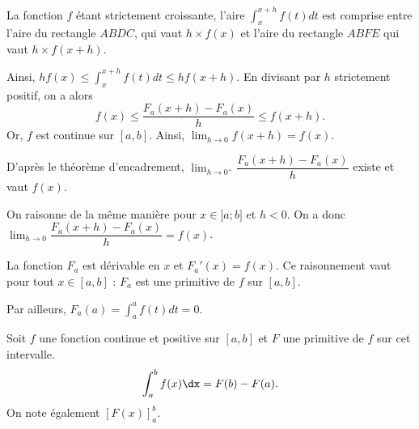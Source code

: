 \documentclass[11pt,fleqn, openany]{book} %
\begin{document}
\begin{demonstration}
\begin{center}
\end{center}

La fonction $f$ étant strictement croissante, l'aire $\displaystyle\int_{x}^{x+h} f(t)dt$ est comprise entre l'aire du rectangle $ABDC$, qui vaut $h \times f(x)$ et l'aire du rectangle $ABFE$ qui vaut $h \times f(x+h)$.

Ainsi, $hf(x)\leqslant \displaystyle\int_{x}^{x+h} f(t)dt \leqslant hf(x+h)$. En divisant par $h$ strictement positif, on a alors
\[ f(x) \leqslant \dfrac{F_a(x+h)-F_a(x)}{h} \leqslant f(x+h).\]
Or, $f$ est continue sur $[a,b]$. Ainsi, $\displaystyle \lim_{h \to 0} f(x+h)=f(x)$. 

D'après le théorème d'encadrement, $\displaystyle \lim_{h \to 0^+}\dfrac{F_a(x+h)-F_a(x)}{h}$ existe et vaut $f(x)$.

On raisonne de la même manière pour $x\in]a;b]$ et $h<0$. On a donc $\displaystyle \lim_{h \to 0}\dfrac{F_a(x+h)-F_a(x)}{h}=f(x)$. 

La fonction $F_a$ est dérivable en $x$ et $F_a'(x)=f(x)$. Ce raisonnement vaut pour tout $x\in[a,b]$ : $F_a$ est une primitive de $f$ sur $[a,b]$.

Par ailleurs, $F_a(a)=\displaystyle\int_{a}^a f(t)dt=0$.\end{demonstration}

\begin{definition}Soit $f$ une fonction continue et positive sur $[a,b]$ et $F$ une primitive de $f$ sur cet intervalle.
 \[\displaystyle\int_{a}^b f(x)\dx=F(b)-F(a).\]
 On note également $[F(x)]_a^b$.\end{definition}
 
\end{document}
